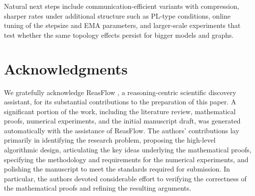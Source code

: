\documentclass{article}
\begin{document}
Natural next steps include communication-efficient variants with compression,
sharper rates under additional structure such as PL-type conditions, online
tuning of the stepsize and EMA parameters, and larger-scale experiments that
test whether the same topology effects persist for bigger models and graphs.


\section*{Acknowledgments}
We gratefully acknowledge ReasFlow \citep{reasflowteam2026reasflow}, a reasoning-centric scientific discovery assistant, for its substantial contributions to the preparation of this paper. A significant portion of the work, including the literature review, mathematical proofs, numerical experiments, and the initial manuscript draft, was generated automatically with the assistance of ReasFlow. The authors’ contributions lay primarily in identifying the research problem, proposing the high-level algorithmic design, articulating the key ideas underlying the mathematical proofs, specifying the methodology and requirements for the numerical experiments, and polishing the manuscript to meet the standards required for submission. In particular, the authors devoted considerable effort to verifying the correctness of the mathematical proofs and refining the resulting arguments.



\end{document}
